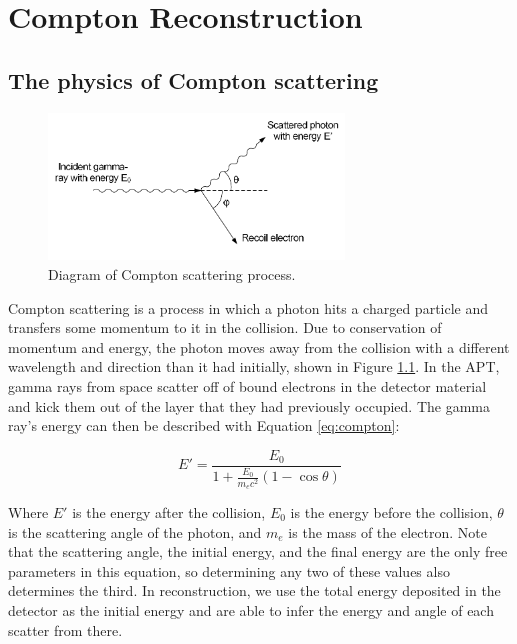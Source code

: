 %
\chapter{Compton Reconstruction}

\section{The physics of Compton scattering}

\begin{figure}
    \centering
    \includegraphics[width=0.7\textwidth]{Compton_scatter.png}
    \caption{Diagram of Compton scattering process. \cite{comptonThesis}}
    \label{fig:compton_scatter}
\end{figure}

Compton scattering is a process in which a photon hits a charged particle and transfers some momentum to it in the collision. Due to conservation of momentum and energy, the photon moves away from the collision with a different wavelength and direction than it had initially, shown in Figure \ref{fig:compton_scatter}. In the APT, gamma rays from space scatter off of bound electrons in the detector material and kick them out of the layer that they had previously occupied. The gamma ray's energy can then be described with Equation \ref{eq:compton}:

\begin{equation}
    \label{eq:compton}E' = \frac{E_0}{1+\frac{E_0}{m_ec^2}(1-\cos\theta)}
\end{equation}

Where $E'$ is the energy after the collision, $E_0$ is the energy before the collision, $\theta$ is the scattering angle of the photon, and $m_e$ is the mass of the electron. Note that the scattering angle, the initial energy, and the final energy are the only free parameters in this equation, so determining any two of these values also determines the third. In reconstruction, we use the total energy deposited in the detector as the initial energy and are able to infer the energy and angle of each scatter from there.

